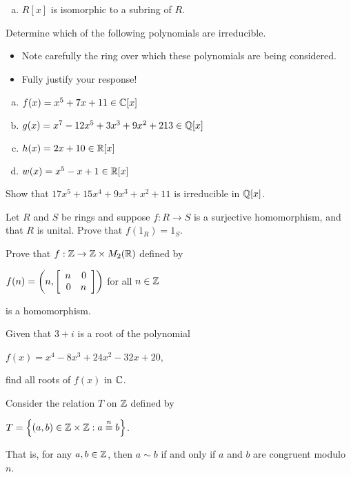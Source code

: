 \documentclass[11pt]{exam}
\begin{document}
\begin{questions}
\begin{enumerate}[(a)]
\item \underline{\hspace{1cm}} $R[x]$ is isomorphic to a subring of $R$.
\vsp


\end{enumerate}
\newpage

\question[6] Determine which of the following polynomials are irreducible.
\begin{itemize}
\item Note carefully the ring over which these polynomials are being considered.
\item Fully justify your response!
\end{itemize}
\begin{enumerate}[(a)]
\item $f(x) = x^5 + 7x + 11\in \C[x]$
\vfill

\item $g(x) = x^7 - 12x^5 + 3x^3 + 9x^2 + 213\in\Q[x]$
\vfill

\item $h(x) = 2x + 10 \in \R[x]$
\vfill

\item $w(x) = x^5 - x + 1\in \R[x]$
\vfill
\end{enumerate}
\newpage

\question[3] Show that $17x^5 + 15x^4 + 9x^3 + x^2 + 11$ is irreducible in $\Q[x]$.
\newpage

\question[3] Let $R$ and $S$ be rings and suppose $f:R\to S$ is a surjective homomorphism, and that $R$ is unital.  Prove that $f(1_{R}) = 1_{S}$.
\newpage

\question[3] Prove that $f:\Z\to \Z\times M_{2}(\R)$ defined by
\begin{center}
$f(n) = \left(n,\MATRIX{rr}{n & 0\\0 & n}\right)$ for all $n\in \Z$
\end{center}
is a homomorphism.
\newpage

\question[3] Given that $3 + i$ is a root of the polynomial
\begin{center}
$f(x) = x^4 - 8x^3 + 24x^2 - 32x + 20$,
\end{center}
find all roots of $f(x)$ in $\C$.
\newpage

\question[5] Consider the relation $T$ on $\Z$ defined by
\begin{center}
$T = \SET{(a,b)\in \Z\times \Z:a\overset{n}{\equiv} b}$.
\end{center}
That is, for any $a,b\in \Z$, then $a\sim b$ if and only if $a$ and $b$ are congruent modulo $n$.
\vsp


\end{questions}
\end{document}
